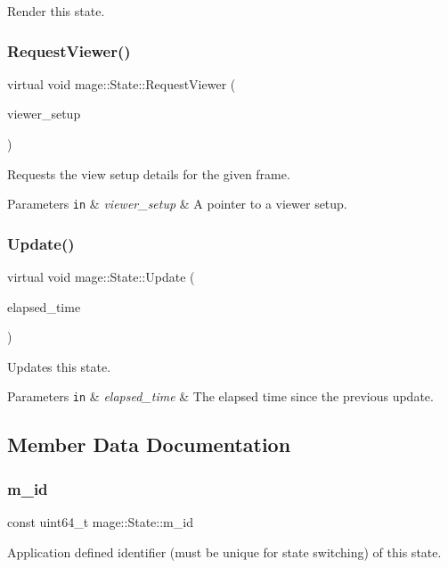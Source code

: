 Render this state. \hypertarget{classmage_1_1_state_ab86748cfd13a65da65d3a639a0de2077}{}\label{classmage_1_1_state_ab86748cfd13a65da65d3a639a0de2077} 
\subsubsection{\texorpdfstring{Request\+Viewer()}{RequestViewer()}}
{\footnotesize\ttfamily virtual void mage\+::\+State\+::\+Request\+Viewer (\begin{DoxyParamCaption}\item[{\hyperlink{structmage_1_1_viewer_setup}{Viewer\+Setup} $\ast$}]{viewer\+\_\+setup }\end{DoxyParamCaption})\hspace{0.3cm}{\ttfamily [virtual]}}

Requests the view setup details for the given frame.


\begin{DoxyParams}[1]{Parameters}
\mbox{\tt in}  & {\em viewer\+\_\+setup} & A pointer to a viewer setup. \\
\hline
\end{DoxyParams}
\hypertarget{classmage_1_1_state_afbee8caa84e0c69ac5757f7e5e87317f}{}\label{classmage_1_1_state_afbee8caa84e0c69ac5757f7e5e87317f} 
\subsubsection{\texorpdfstring{Update()}{Update()}}
{\footnotesize\ttfamily virtual void mage\+::\+State\+::\+Update (\begin{DoxyParamCaption}\item[{double}]{elapsed\+\_\+time }\end{DoxyParamCaption})\hspace{0.3cm}{\ttfamily [virtual]}}

Updates this state.


\begin{DoxyParams}[1]{Parameters}
\mbox{\tt in}  & {\em elapsed\+\_\+time} & The elapsed time since the previous update. \\
\hline
\end{DoxyParams}


\subsection{Member Data Documentation}
\hypertarget{classmage_1_1_state_ab135514ec2250e9680b35cfab4e91cab}{}\label{classmage_1_1_state_ab135514ec2250e9680b35cfab4e91cab} 
\subsubsection{\texorpdfstring{m\+\_\+id}{m\_id}}
{\footnotesize\ttfamily const uint64\+\_\+t mage\+::\+State\+::m\+\_\+id\hspace{0.3cm}{\ttfamily [private]}}

Application defined identifier (must be unique for state switching) of this state. 